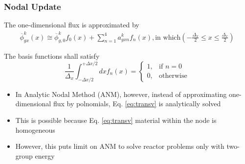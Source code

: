 \documentclass{beamer}
\begin{document}
\begin{frame}
\frametitle{Nodal Update}
\begin{block}{The one-dimensional flux is approximated by}
    \begin{equation}
      \begin{split}
        \overline \phi  _{gx}^k(x) \cong \overline \phi  _{g,0}^k{f_0}(x) + \sum\limits_{n = 1}^4 {a_{gxn}^k} {f_n}(x), \text{in which} \left( { - \frac{{{\Delta _x}}}{2} \le x \le \frac{{{\Delta _x}}}{2}} \right)  \label{eq:exp}
      \end{split}
    \end{equation}
\end{block}
\begin{block}{The basis functions shall satisfy}
    \begin{equation}
      \frac{1}{\Delta _x} \int_{ - \Delta x/2}^{ + \Delta x/2} {dx} {f_n}(x) =
      \begin{cases}
      1,& \text{if } n = 0 \\
      0,& \text{otherwise}
      \end{cases}
    \end{equation}
\end{block}

\begin{itemize}
\item In Analytic Nodal Method (ANM), however, instead of approximating one-dimensional flux by polnomials, Eq. \eqref{eq:transv} is analytically solved
\item This is possible because Eq. \eqref{eq:transv} material within the node is homogeneous
\item However, this puts limit on ANM to solve reactor problems only with two-group energy
\end{itemize}

\textbf{}
\end{frame}

\end{document}
